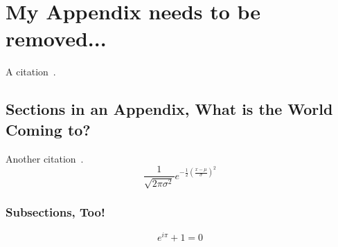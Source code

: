 \chapter{My Appendix needs to be removed...}


A citation~\cite{bib2}. \lipsum[1]

\section{Sections in an Appendix, What is the World Coming to?}

Another citation~\cite{bib1}.  \lipsum[1]
\begin{equation}
\frac{1}{\sqrt{2\pi \sigma^2}}e^{-\frac{1}{2}(\frac{x-\mu}{\sigma})^2}
\end{equation}
\lipsum[1]

\subsection{Subsections, Too!}

\lipsum[2-5]
\begin{equation}
e^{i\pi} + 1 = 0
\end{equation}
\lipsum[1-3]
